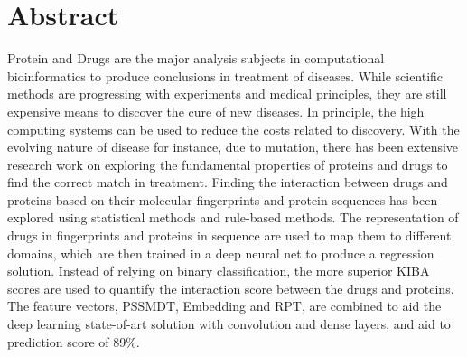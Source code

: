 

\chapter*{Abstract}
\doublespacing
Protein and Drugs are the major analysis subjects in computational bioinformatics to produce conclusions in treatment of diseases. While scientific methods are progressing with experiments and medical principles, they are still expensive means to discover the cure of new diseases. In principle, the high computing systems can be used to reduce the costs related to discovery. With the evolving nature of disease for instance, due to mutation, there has been extensive research work on exploring the fundamental properties of proteins and drugs to find the correct match in treatment. Finding the interaction between drugs and proteins based on their molecular fingerprints and protein sequences has been explored using statistical methods and rule-based methods. The representation of drugs in fingerprints and proteins in sequence are used to map them to different domains, which are then trained in a deep neural net to produce a regression solution. Instead of relying on binary classification, the more superior KIBA scores are used to quantify the interaction score between the drugs and proteins. The feature vectors, PSSMDT, Embedding and RPT, are combined to aid the deep learning state-of-art solution with convolution and dense layers, and aid to prediction score of 89\%.